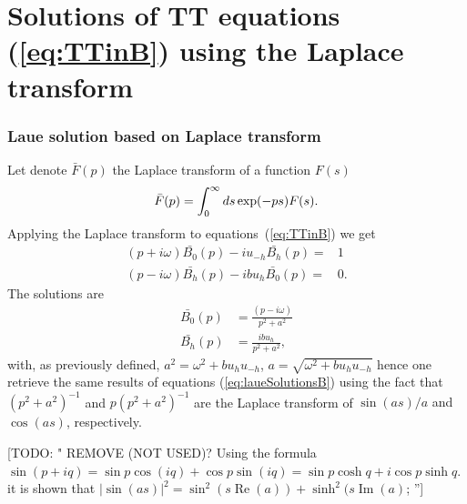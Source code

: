\documentclass[preprint]{iucr}              %
\newcommand{\todo}[1]{{\color{red}[TODO: "#1'']}}
\newcommand{\inred}[1]{{\color{red}#1}}
\begin{document}


\appendix

\section{Solutions of TT equations (\ref{eq:TTinB}) using the Laplace transform}
\label{appendix:laplace}


\subsubsection{Laue solution based on Laplace transform}
\label{sec:laplaceLaue}
Let denote $\bar{F}(p)$ the Laplace transform of a function $F(s)$
\begin{equation}
\Bar{F}(p) = \int_0^\infty ds \exp(-p s) F(s).
\end{equation}
Applying the Laplace transform to equations~(\ref{eq:TTinB}) we get
\begin{subequations}
\label{eq:TTlaueLaplace}
\begin{align}
(p + i \omega) \bar{B_0}(p) - i u_{-h} \bar{B_h}(p)= & 1 \\
(p - i \omega) \bar{B_h}(p) - i b u_{h} \bar{B_0}(p)= & 0.
\end{align}
\end{subequations}
The solutions are
\begin{subequations}
\begin{align}
\bar{B_0}(p) &= \frac{(p - i \omega) }{p^2 + a^2} \\
\bar{B_h}(p) &= \frac{i b u_h}{p^2 + a^2},
\end{align}
\end{subequations}
with, \inred{as previously defined,} $a^2=\omega^2 + b u_h u_{-h}$, $a=\sqrt{\omega^2+b u_h u_{-h}}$
hence one retrieve the same results of equations (\ref{eq:laueSolutionsB}) using the fact that  $(p^2+a^2)^{-1}$ and $p(p^2+a^2)^{-1}$ are the Laplace transform of \inred{ $\sin(a s)/a$ and $\cos(a s)$}, respectively. 

\todo{ REMOVE (NOT USED)? Using the formula $\sin(p+i q)=\sin p \cos(i q) + \cos p \sin(i q)=\sin p \cosh q + i \cos p \sinh q$. it is shown that $|\sin(a s)|^2=\sin^2(s \operatorname{Re}(a)) + \sinh^2(s \operatorname{Im}(a)$;
}
\end{document}
